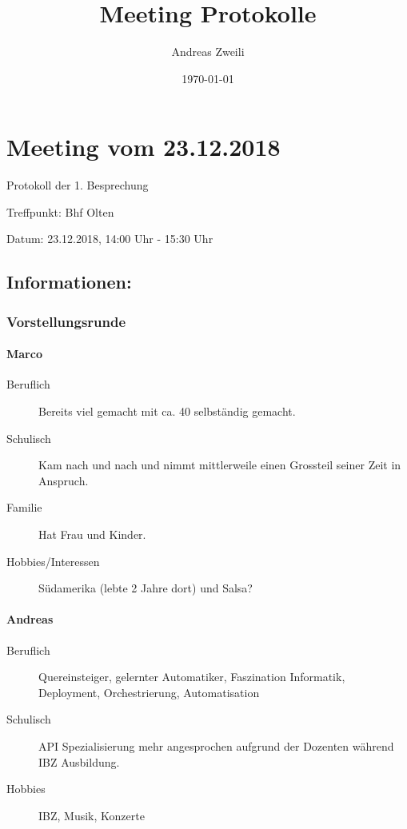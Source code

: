 \documentclass[a4paper,11pt]{article}
\author{Andreas Zweili}
\date{\today}
\title{Meeting Protokolle}
\begin{document}
\maketitle\newpage

\section*{Meeting vom 23.12.2018}
\label{sec:org473d299}
Protokoll der 1. Besprechung

Treffpunkt: Bhf Olten

Datum: 23.12.2018, 14:00 Uhr - 15:30 Uhr

\subsection*{Informationen:}
\label{sec:org1431703}

\subsubsection*{Vorstellungsrunde}
\label{sec:orgcfc00b6}
\paragraph*{Marco}
\label{sec:org08684d1}
\begin{description}
\item[{Beruflich}] Bereits viel gemacht mit ca. 40 selbständig gemacht.
\item[{Schulisch}] Kam nach und nach und nimmt mittlerweile einen Grossteil seiner
Zeit in Anspruch.
\item[{Familie}] Hat Frau und Kinder.
\item[{Hobbies/Interessen}] Südamerika (lebte 2 Jahre dort) und Salsa?
\end{description}

\paragraph*{Andreas}
\label{sec:orge2cf9cd}
\begin{description}
\item[{Beruflich}] Quereinsteiger, gelernter Automatiker, Faszination Informatik,
Deployment, Orchestrierung, Automatisation
\item[{Schulisch}] API Spezialisierung mehr angesprochen aufgrund der Dozenten
während IBZ Ausbildung.
\item[{Hobbies}] IBZ, Musik, Konzerte
\end{description}
\end{document}
